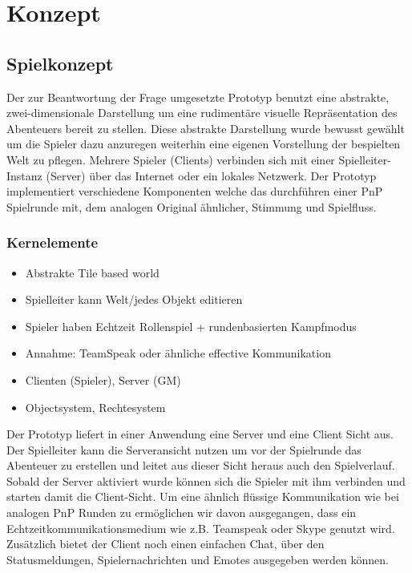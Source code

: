 \chapter{Konzept}
\label{concept}


\section{Spielkonzept}
\label{sec:Grobkonzept}
Der zur Beantwortung der Frage umgesetzte Prototyp benutzt eine abstrakte, zwei-dimensionale Darstellung um eine rudimentäre visuelle Repräsentation des Abenteuers bereit zu stellen. Diese abstrakte Darstellung wurde bewusst gewählt um die Spieler dazu anzuregen weiterhin eine eigenen Vorstellung der bespielten Welt zu pflegen. Mehrere Spieler (Clients) verbinden sich mit einer Spielleiter-Instanz (Server) über das Internet  oder ein lokales Netzwerk. Der Prototyp implementiert verschiedene Komponenten welche das durchführen einer PnP Spielrunde mit, dem analogen Original ähnlicher, Stimmung und Spielfluss.



\subsection{Kernelemente}

\begin{itemize}
	\item Abstrakte Tile based world
	\item Spielleiter kann Welt/jedes Objekt editieren
	\item Spieler haben Echtzeit Rollenspiel + rundenbasierten Kampfmodus
	\item Annahme: TeamSpeak oder ähnliche effective Kommunikation
	\item Clienten (Spieler),  Server (GM)
	\item Objectsystem, Rechtesystem
\end{itemize}

Der Prototyp liefert in einer Anwendung eine Server und eine Client Sicht aus. Der Spielleiter kann die Serveransicht nutzen um vor der Spielrunde das Abenteuer zu erstellen und leitet aus dieser Sicht heraus auch den Spielverlauf. Sobald der Server aktiviert wurde können sich die Spieler mit ihm verbinden und starten damit die Client-Sicht. Um eine ähnlich flüssige Kommunikation wie bei analogen PnP Runden zu ermöglichen wir davon ausgegangen, dass ein Echtzeitkommunikationsmedium wie z.B. Teamspeak oder Skype genutzt wird. Zusätzlich bietet der Client noch einen einfachen Chat, über den Statusmeldungen, Spielernachrichten und Emotes ausgegeben werden können. 

